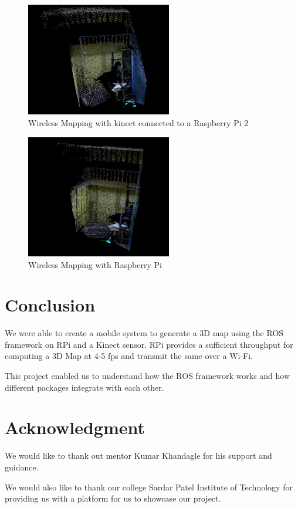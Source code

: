 \documentclass[journal]{IEEEtran}
\begin{document}
\begin{figure}[ht]
	\centering
	\includegraphics[width=2.5in]{2(1).png}
	\caption{Wireless Mapping with kinect connected to a Raspberry Pi 2}
	\label{fig_sim}
\end{figure}

\begin{figure}[ht]
	\centering
	\includegraphics[width=2.5in]{2(2).png}
	\caption{Wireless Mapping with Raspberry Pi}
	\label{fig_sim}
\end{figure}

\section{Conclusion}
We were able to create a mobile system to generate a 3D map using the ROS framework on RPi and a Kinect sensor.
RPi provides a sufficient throughput for computing a 3D Map at 4-5 fps and transmit the same over a Wi-Fi.

This project enabled us to understand how the ROS framework works and how different packages integrate with each other.

\section*{Acknowledgment}

We would like to thank out mentor Kumar Khandagle for his support and guidance.

We would also like to thank our college Sardar Patel Institute of Technology for providing us with a platform for us to showcase our project.
\end{document}

